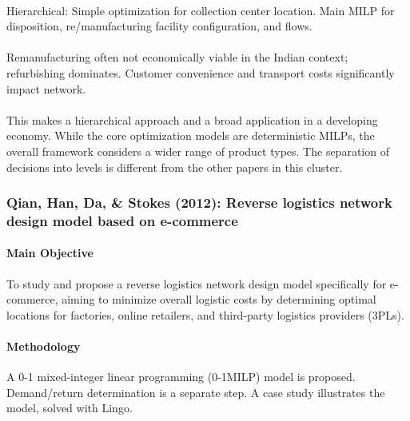 \paragraph{} Hierarchical: Simple optimization for collection center location. Main MILP for disposition, re/manufacturing facility configuration, and flows.

\paragraph{} Remanufacturing often not economically viable in the Indian context; refurbishing dominates. Customer convenience and transport costs significantly impact network.

\paragraph{} This makes a hierarchical approach and a broad application in a developing economy. While the core optimization models are deterministic MILPs, the overall framework considers a wider range of product types. The separation of decisions into levels is different from the other papers in this cluster.

\subsubsection{Qian, Han, Da, \& Stokes (2012): Reverse logistics network design model based on e-commerce}
\paragraph{Main Objective} To study and propose a reverse logistics network design model specifically for e-commerce, aiming to minimize overall logistic costs by determining optimal locations for factories, online retailers, and third-party logistics providers (3PLs).
\paragraph{Methodology} A 0-1 mixed-integer linear programming (0-1MILP) model is proposed. Demand/return determination is a separate step. A case study illustrates the model, solved with Lingo.
